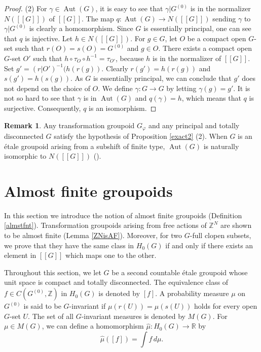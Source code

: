 \documentclass[11pt]{article}
\theoremstyle{definition}
\newtheorem{rem}[thm]{Remark}
\renewcommand{\phi}{\varphi}
\newcommand{\Aut}{\operatorname{Aut}}
\newcommand{\Z}{\mathbb{Z}}
\newcommand{\R}{\mathbb{R}}
\begin{document}
\begin{proof}
(2)
For $\gamma\in\Aut(G)$, it is easy to see that 
$\gamma|G^{(0)}$ is in the normalizer $N([[G]])$ of $[[G]]$. 
The map $q:\Aut(G)\to N([[G]])$ sending $\gamma$ to $\gamma|G^{(0)}$ 
is clearly a homomorphism. 
Since $G$ is essentially principal, one can see that $q$ is injective. 
Let $h\in N([[G]])$. 
For $g\in G$, let $O$ be a compact open $G$-set such that 
$r(O)=s(O)=G^{(0)}$ and $g\in O$. 
There exists a compact open $G$-set $O'$ 
such that $h\circ\tau_O\circ h^{-1}=\tau_{O'}$, 
because $h$ is in the normalizer of $[[G]]$. 
Set $g'=(r|O')^{-1}(h(r(g))$. 
Clearly $r(g')=h(r(g))$ and $s(g')=h(s(g))$. 
As $G$ is essentially principal, 
we can conclude that $g'$ does not depend on the choice of $O$. 
We define $\gamma:G\to G$ by letting $\gamma(g)=g'$. 
It is not so hard to see that $\gamma$ is in $\Aut(G)$ and $q(\gamma)=h$, 
which means that $q$ is surjective. 
Consequently, $q$ is an isomorphism. 
\end{proof}

\begin{rem}
Any transformation groupoid $G_\phi$ and 
any principal and totally disconnected $G$ satisfy 
the hypothesis of Proposition \ref{exact2} (2). 
When $G$ is an \'etale groupoid arising from a subshift of finite type, 
$\Aut(G)$ is naturally isomorphic to $N([[G]])$ 
(\cite[Theorem 1.3]{Matsu}). 
\end{rem}




\section{Almost finite groupoids}

In this section we introduce the notion of almost finite groupoids 
(Definition \ref{almstfnt}). 
Transformation groupoids arising from free actions of $\Z^N$ are 
shown to be almost finite (Lemma \ref{ZNisAF}). 
Moreover, for two $G$-full clopen subsets, 
we prove that they have the same class in $H_0(G)$ 
if and only if there exists an element in $[[G]]$ which maps one to the other. 

Throughout this section, 
we let $G$ be a second countable \'etale groupoid 
whose unit space is compact and totally disconnected. 
The equivalence class of $f\in C(G^{(0)},\Z)$ in $H_0(G)$ is denoted by $[f]$. 
A probability measure $\mu$ on $G^{(0)}$ is said to be $G$-invariant 
if $\mu(r(U))=\mu(s(U))$ holds for every open $G$-set $U$. 
The set of all $G$-invariant measures is denoted by $M(G)$. 
For $\mu\in M(G)$, 
we can define a homomorphism $\hat\mu:H_0(G)\to\R$ by 
\[
\hat\mu([f])=\int f\,d\mu. 
\]
\end{document}
